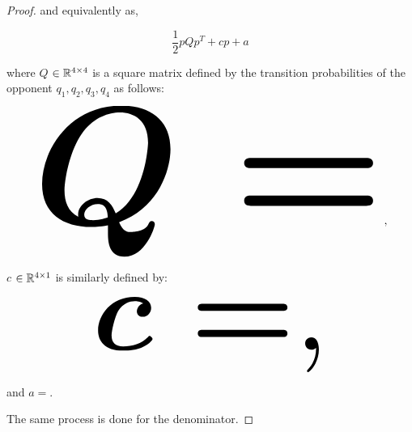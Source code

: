 \begin{proof}
and equivalently as,

\[\frac{1}{2}pQp^T + cp + a\]

where \(Q\) \(\in \mathbb{R}^{4\times4}\) is a square matrix defined by the
transition probabilities of the opponent \(q_1, q_2, q_3, q_4\) as follows:

\begin{equation*}
    \resizebox{0.9\linewidth}{!}{\arraycolsep=2.5pt%
    \boldmath\(
    Q = \)},
\end{equation*}

\(c\) \(\in \mathbb{R}^{4 \times 1}\) is similarly defined by:

\begin{equation*}
    \resizebox{0.6\linewidth}{!}{\arraycolsep=2.5pt%
    \boldmath\(c = \),}
\end{equation*}

and \(a = \).

The same process is done for the denominator.
\end{proof}